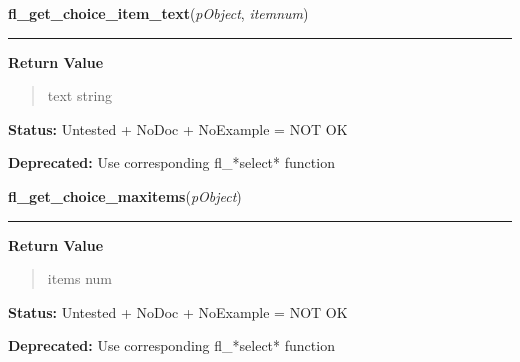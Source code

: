 \hspace{.8\funcindent}\begin{boxedminipage}{\funcwidth}

    \raggedright \textbf{fl\_get\_choice\_item\_text}(\textit{pObject}, \textit{itemnum})

    \vspace{-1.5ex}

    \rule{\textwidth}{0.5\fboxrule}
\setlength{\parskip}{2ex}
\setlength{\parskip}{1ex}
      \textbf{Return Value}
    \vspace{-1ex}

      \begin{quote}
      text string

      \end{quote}

\textbf{Status:} Untested + NoDoc + NoExample = NOT OK



\textbf{Deprecated:} Use corresponding fl\_*select* function



    \end{boxedminipage}

    \label{xformslib:library:fl_get_choice_maxitems}

    \vspace{0.5ex}

\hspace{.8\funcindent}\begin{boxedminipage}{\funcwidth}

    \raggedright \textbf{fl\_get\_choice\_maxitems}(\textit{pObject})

    \vspace{-1.5ex}

    \rule{\textwidth}{0.5\fboxrule}
\setlength{\parskip}{2ex}
\setlength{\parskip}{1ex}
      \textbf{Return Value}
    \vspace{-1ex}

      \begin{quote}
      items num

      \end{quote}

\textbf{Status:} Untested + NoDoc + NoExample = NOT OK



\textbf{Deprecated:} Use corresponding fl\_*select* function



    \end{boxedminipage}

